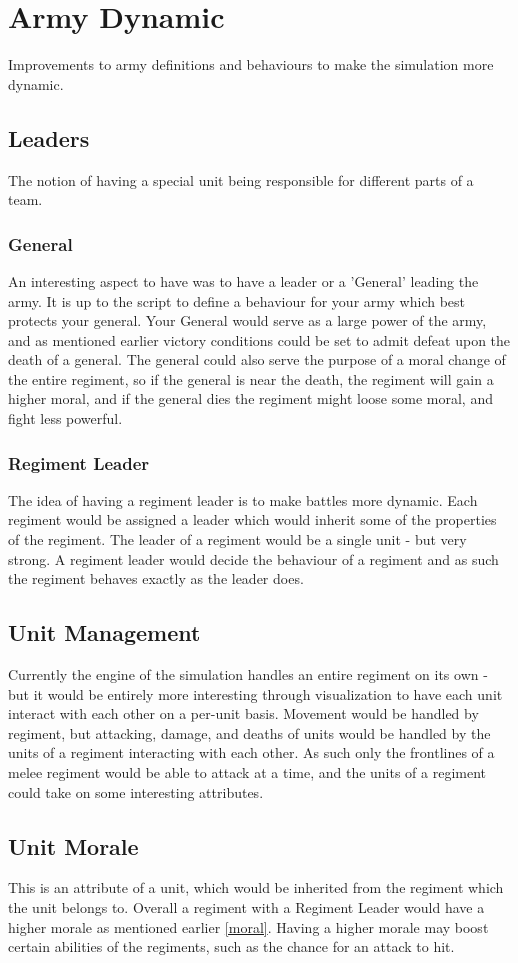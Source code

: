\section{Army Dynamic}
Improvements to army definitions and behaviours to make the simulation more dynamic.
\subsection{Leaders}
The notion of having a special unit being responsible for different parts of a team.
\subsubsection*{General}
An interesting aspect to have was to have a leader or a 'General' leading the army. It is up to the script to define a behaviour for your army which best protects your general. Your General would serve as a large power of the army, and as mentioned earlier victory conditions could be set to admit defeat upon the death of a general.\label{moral} The general could also serve the purpose of a moral change of the entire regiment, so if the general is near the death, the regiment will gain a higher moral, and if the general dies the regiment might loose some moral, and fight less powerful.
\subsubsection*{Regiment Leader}
The idea of having a regiment leader is to make battles more dynamic. Each regiment would be assigned a leader which would inherit some of the properties of the regiment.
The leader of a regiment would be a single unit - but very strong. A regiment leader would decide the behaviour of a regiment and as such the regiment behaves exactly as the leader does.
\subsection{Unit Management}
Currently the engine of the simulation handles an entire regiment on its own - but it would be entirely more interesting through visualization to have each unit interact with each other on a per-unit basis. Movement would be handled by regiment, but attacking, damage, and deaths of units would be handled by the units of a regiment interacting with each other. As such only the frontlines of a melee regiment would be able to attack at a time, and the units of a regiment could take on some interesting attributes.
\subsection{Unit Morale}
This is an attribute of a unit, which would be inherited from the regiment which the unit belongs to. Overall a regiment with a Regiment Leader would have a higher morale as mentioned earlier \ref{moral}. Having a higher morale may boost certain abilities of the regiments, such as the chance for an attack to hit.
